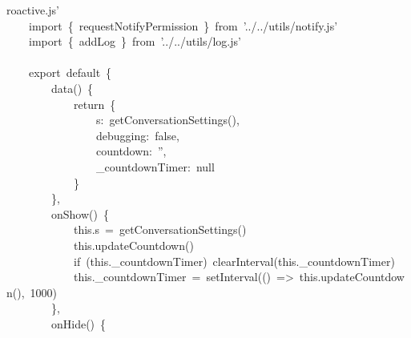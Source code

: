 \documentclass[a4paper,10pt]{article}
\begin{document}
{roactive.js'\\
~~~~import~\{~requestNotifyPermission~\}~from~'../../utils/notify.js'\\
~~~~import~\{~addLog~\}~from~'../../utils/log.js'\\
\mbox{}\\
~~~~export~default~\{\\
~~~~~~~~data()~\{\\
~~~~~~~~~~~~return~\{\\
~~~~~~~~~~~~~~~~s:~getConversationSettings(),\\
~~~~~~~~~~~~~~~~debugging:~false,\\
~~~~~~~~~~~~~~~~countdown:~'',\\
~~~~~~~~~~~~~~~~\_countdownTimer:~null\\
~~~~~~~~~~~~\}\\
~~~~~~~~\},\\
~~~~~~~~onShow()~\{\\
~~~~~~~~~~~~this.s~=~getConversationSettings()\\
~~~~~~~~~~~~this.updateCountdown()\\
~~~~~~~~~~~~if~(this.\_countdownTimer)~clearInterval(this.\_countdownTimer)\\
~~~~~~~~~~~~this.\_countdownTimer~=~setInterval(()~=>~this.updateCountdown(),~1000)\\
~~~~~~~~\},\\
~~~~~~~~onHide()~\{
}

\newpage
\end{document}

